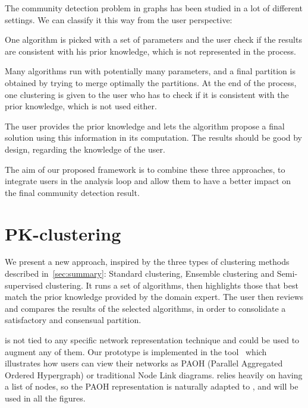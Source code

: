 The community detection problem in graphs has been studied in a lot of different settings. We can classify it this way from the user perspective:
\begin{description}[leftmargin=0pt,nosep]
\item [Standard clustering.] One algorithm is picked with a set of parameters and the user check if the results are consistent with his prior knowledge, which is not represented in the process.
\item [Ensemble clustering.] Many algorithms run with potentially many parameters, and a final partition is obtained by trying to merge optimally the partitions. At the end of the process, one clustering is given to the user who has to check if it is consistent with the prior knowledge, which is not used either.
\item [Semi-supervised clustering.] The user provides the prior knowledge and lets the algorithm propose a final solution using this information in its computation. The results should be good by design, regarding the knowledge of the user.
\end{description}

The aim of our proposed framework is to combine these three approaches, to integrate users in the analysis loop and allow them to have a better impact on the final community detection result.


\section{PK-clustering}

We present a new approach, inspired by the three types of clustering methods described in~\autoref{sec:summary}: Standard clustering, Ensemble clustering and Semi-supervised clustering. It runs a set of algorithms, then highlights those that best match the prior knowledge provided by the domain expert. %
The user then reviews and compares the results of the selected algorithms, in order to consolidate a satisfactory and consensual partition.

\pkclustering is not tied to any specific network representation technique and could be used to augment any of them. Our prototype is implemented in the \paovis tool~\cite{valdiviaAnalyzingDynamicHypergraphs2021} which illustrates how users can view their networks as PAOH (Parallel Aggregated Ordered Hypergraph) or traditional Node Link diagrams. \pkclustering relies heavily on having a list of nodes, so the PAOH representation is naturally adapted to \pkclustering, and will be used in all the figures.

